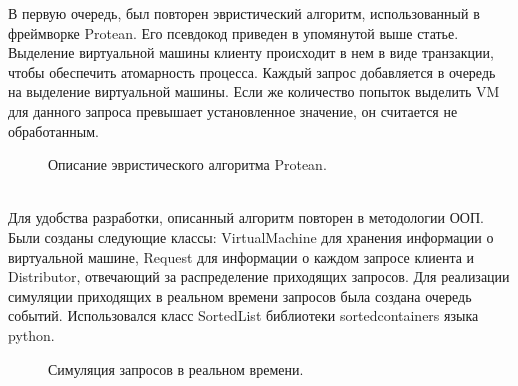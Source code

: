 \documentclass{article}
\begin{document}
\newpage
В первую очередь, был повторен эвристический алгоритм, использованный в фреймворке Protean. Его псевдокод приведен в упомянутой выше статье. Выделение виртуальной машины клиенту происходит в нем в виде транзакции, чтобы обеспечить атомарность процесса. Каждый запрос добавляется в очередь на выделение виртуальной машины. Если же количество попыток выделить VM для данного запроса превышает установленное значение, он считается не обработанным.\\
\begin{figure}[h]
\caption{Описание эвристического алгоритма Protean\cite{litlink21}.}
\label{ris:image}
\end{figure}\\
Для удобства разработки, описанный алгоритм повторен в методологии ООП. Были созданы следующие классы: VirtualMachine для хранения информации о виртуальной машине, Request для информации о каждом запросе клиента и Distributor, отвечающий за распределение приходящих запросов. Для реализации симуляции приходящих в реальном времени запросов была создана очередь событий. Использовался класс SortedList библиотеки sortedcontainers языка python. 
\begin{figure}[h!]
\caption{Симуляция запросов в реальном времени.}
\label{ris:image}
\end{figure}\\
\end{document}
